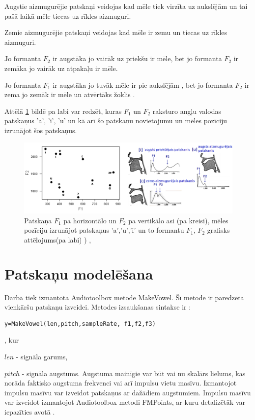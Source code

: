 \documentclass[12pt,paper=A4]{report}
\begin{document}
Augstie aizmugurējie patskaņi veidojas kad mēle tiek virzīta uz aukslējām un tai pašā laikā 
mēle tiecas uz rīkles aizmuguri. 

Zemie aizmugurējie patskaņi veidojas kad mēle ir zemu un tiecas uz  rīkles aizmuguri\cite{dtw49}.

 Jo formanta $F_2$ ir augstāka jo vairāk uz priekšu ir mēle, bet jo formanta $F_2$ ir zemāka jo vairāk uz atpakaļu ir mēle.
 
 Jo formanta $F_1$ ir augstāka jo tuvāk mēle ir pie aukslējām , bet jo formanta $F_2$ ir zema jo zemāk ir mēle un atvērtāks žoklis \cite{dtw50}.

Attēlā \ref{formantas3} bildē pa labi var redzēt, kuras $F_1$ un $F_2$ raksturo angļu valodas patskaņus 'a', 'i', 'u' un kā arī šo patskaņu novietojumu un mēles pozīciju izrunājot šos patskaņus.

\begin{figure}[H] \centering
\includegraphics[width=1.00\textwidth]{vowels2} 
\caption{Patskaņa $F_1$ pa horizontālo un $F_2$ pa vertikālo asi (pa kreisi), mēles pozīciju izrunājot patskaņus 'a','u','i' un to formantu $F_1$, $F_2$ grafisks attēlojums(pa labi)
) \cite{edist}, \cite{http://www.charlesames.net/pdf/JamesKirby/lecture12-hanoi-4up.pdf}}  \label{formantas3} 
\end{figure}


\section{Patskaņu modelēšana}
\label{appendix:makevowel}
Darbā tiek izmantota Audiotoolbox \cite{dtw38} metode MakeVowel. Šī metode ir paredzēta vienkāršu patskaņu izveidei. Metodes izsaukšanas sintakse ir :
\begin{lstlisting}
y=MakeVowel(len,pitch,sampleRate, f1,f2,f3)
\end{lstlisting}

, kur

$len$ - signāla garums, 

$pitch$ - signāla augstums. Augstuma mainīgie var būt vai nu skalārs lielums, kas norāda faktisko augstuma frekvenci vai arī impulsu vietu masīvu. Izmantojot impulsu masīvu var izveidot patskaņus ar dažādiem augstumiem. Impulsu masīvu var izveidot izmantojot Audiotoolbox metodi FMPoints, ar kuru detalizētāk var iepazīties avotā \cite{dtw17}. 
\end{document}
